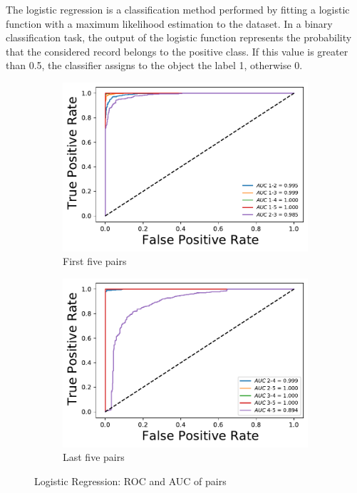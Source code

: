 \documentclass[10pt, a4paper, twocolumn]{article}
\begin{document}
The logistic regression is a classification method performed by fitting a logistic function 
with a maximum likelihood estimation to the dataset. In a binary classification task, the output of the logistic function represents the probability that the considered record belongs to the positive class. If this value is greater than 0.5, the classifier assigns to the object the label 1, otherwise 0.

\begin{figure}
\centering
    \begin{subfigure}[t]{0.49\columnwidth}
        \includegraphics[width=\linewidth]{log_roc_1.pdf}
        \caption{First five pairs}
        \label{fig:logroc1}
    \end{subfigure}
  \hfill %
    \begin{subfigure}[t]{0.49\columnwidth}
        \includegraphics[width=\linewidth]{log_roc_2.pdf}
        \caption{Last five pairs}
        \label{fig:logroc2}
    \end{subfigure}
\caption{Logistic Regression: ROC and AUC of pairs}
\label{fig:logroc}
\end{figure}
\end{document}
